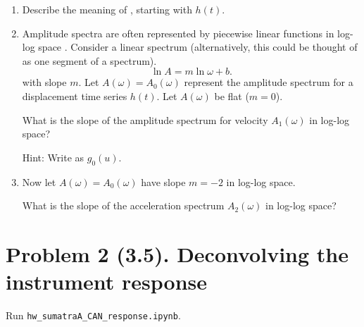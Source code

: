 \documentclass[11pt,titlepage,fleqn]{article}
\newcommand{\fft}{h}
\newcommand{\tfileresponse}{{\tt hw\_sumatraA\_CAN\_response.ipynb}}
\begin{document}
\begin{enumerate}
\begin{enumerate}
\item Describe the meaning of , starting with $\fft(t)$.

\item Amplitude spectra are often represented by piecewise linear functions in log-log space \citep[\eg][Figs.~6.3-6 and 6.6-8]{SteinWysession}. Consider a linear spectrum (alternatively, this could be thought of as one segment of a spectrum).
%
\begin{equation}
\ln A = m \ln\omega + b.
\label{Alin}
\end{equation}
%
with slope $m$.
Let $A(\omega) = A_0(\omega)$ represent the amplitude spectrum for a displacement time series $\fft(t)$. Let $A(\omega)$ be flat ($m=0$).

What is the slope of the amplitude spectrum for velocity $A_1(\omega)$ in log-log space?

Hint: Write  as $g_0(u)$.

\item Now let $A(\omega) = A_0(\omega)$ have slope $m=-2$ in log-log space.

What is the slope of the acceleration spectrum $A_2(\omega)$ in log-log space?

\end{enumerate}

\end{enumerate}


\pagebreak
\section*{Problem 2 (3.5). Deconvolving the instrument response}

Run \tfileresponse.
\end{document}
